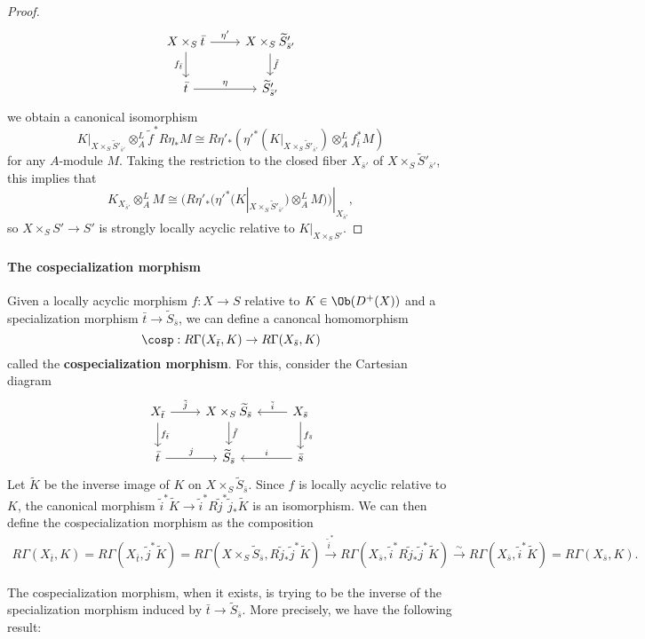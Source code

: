 \begin{proof}
\[\begin{tikzcd}
X\times_S\bar{t}\ar[r,"\eta'"]\ar[d,swap,"f_{\bar{t}}"]&X\times_S\widetilde{S}'_{\bar{s}'}\ar[d,"\tilde{f}"]\\
\bar{t}\ar[r,"\eta"]&\widetilde{S}'_{\bar{s}'}
\end{tikzcd}\]
we obtain a canonical isomorphism
\[K|_{X\times_S\widetilde{S}'_{\bar{s}'}}\otimes_A^L\tilde{f}^*R\eta_*M\cong R\eta'_*(\eta'^*(K|_{X\times_S\widetilde{S}'_{\bar{s}'}})\otimes_A^Lf_{\bar{t}}^*M)\]
for any $A$-module $M$. Taking the restriction to the closed fiber $X_{\bar{s}'}$ of $X\times_S\widetilde{S}'_{\bar{s}'}$, this implies that
\[K_{X_{\bar{s}'}}\otimes_A^LM\cong(R\eta'_*(\eta'^*(K|_{X\times_S\widetilde{S}'_{\bar{s}'}})\otimes_A^LM))|_{X_{\bar{s}'}},\]
so $X\times_SS'\to S'$ is strongly locally acyclic relative to $K|_{X\times_SS'}$.
\end{proof}

\paragraph{The cospecialization morphism}
Given a locally acyclic morphism $f:X\to S$ relative to $K\in\Ob(D^+(X))$ and a specialization morphism $\bar{t}\to\widetilde{S}_{\bar{s}}$, we can define a canoncal homomorphism
\[\cosp:R\Gamma(X_{\bar{t}},K)\to R\Gamma(X_{\bar{s}},K)\]
called the \textbf{cospecialization morphism}. For this, consider the Cartesian diagram
\[\begin{tikzcd}
X_{\bar{t}}\ar[r,"\tilde{j}"]\ar[d,"f_{\bar{t}}"]&X\times_S\widetilde{S}_{\bar{s}}\ar[d,"\tilde{f}"]&X_{\bar{s}}\ar[d,"f_{\bar{s}}"]\ar[l,swap,"\tilde{i}"]\\
\bar{t}\ar[r,"j"]&\widetilde{S}_{\bar{s}}&\bar{s}\ar[l,swap,"i"]
\end{tikzcd}\]
Let $\widetilde{K}$ be the inverse image of $K$ on $X\times_S\widetilde{S}_{\bar{s}}$. Since $f$ is locally acyclic relative to $K$, the canonical morphism $\tilde{i}^*\widetilde{K}\to\tilde{i}^*R\tilde{j}^*\tilde{j}_*\widetilde{K}$ is an isomorphism. We can then define the cospecialization morphism as the composition
\begin{align*}
R\Gamma(X_{\bar{t}},K)=R\Gamma(X_{\bar{t}},\tilde{j}^*\widetilde{K})=R\Gamma(X\times_S\widetilde{S}_{\bar{s}},R\tilde{j}_*\tilde{j}^*\widetilde{K})\stackrel{\tilde{i}^*}{\to}R\Gamma(X_{\bar{s}},\tilde{i}^*R\tilde{j}_*\tilde{j}^*\widetilde{K})\stackrel{\sim}{\to}R\Gamma(X_{\bar{s}},\tilde{i}^*\widetilde{K})=R\Gamma(X_{\bar{s}},K).
\end{align*}

The cospecialization morphism, when it exists, is trying to be the inverse of the specialization morphism induced by $\bar{t}\to\widetilde{S}_{\bar{s}}$. More precisely, we have the following result:

